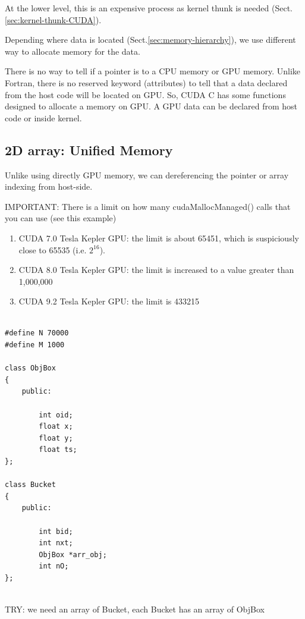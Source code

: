 At the lower level, this is an expensive process as kernel thunk is needed (Sect.\ref{sec:kernel-thunk-CUDA}).

Depending where data is located (Sect.\ref{sec:memory-hierarchy}), we use
different way to allocate memory for the data.


There is no way to tell if a pointer is to a CPU memory or GPU memory.
Unlike Fortran, there is no reserved keyword (attributes) to tell that
a data declared from the host code will be located on GPU. So, CUDA C has some
functions designed to allocate a memory on GPU. A GPU data can be declared from
host code or inside kernel.

\subsection{2D array: Unified Memory}
\label{sec:2d-array-Unified-Memory}

Unlike using directly GPU memory, we can dereferencing the pointer or array
indexing from host-side. 

IMPORTANT: There is a limit on how many cudaMallocManaged() calls that you can use (see this example)
\begin{enumerate}
  
  \item CUDA 7.0 Tesla Kepler GPU: the limit is about 65451, which is
  suspiciously close to 65535 (i.e. $2^{16}$).
  
  \item CUDA 8.0 Tesla Kepler GPU: the limit is increased to a value greater than 1,000,000
  
  \item CUDA 9.2 Tesla Kepler GPU: the limit is 433215
\end{enumerate}

\begin{lstlisting}

#define N 70000
#define M 1000

class ObjBox
{
    public:

        int oid; 
        float x; 
        float y; 
        float ts;
};

class Bucket
{
    public:

        int bid; 
        int nxt; 
        ObjBox *arr_obj; 
        int nO;
};


\end{lstlisting}

TRY: we need an array of Bucket, each Bucket has an array of ObjBox

